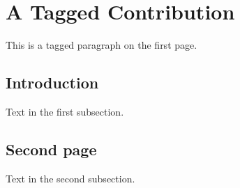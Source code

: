 \documentclass[openany]{book}
\begin{document}
\section{A Tagged Contribution}
This is a tagged paragraph on the first page.
\subsection{Introduction}
Text in the first subsection.
\newpage
\subsection{Second page}
Text in the second subsection.
\end{document}
